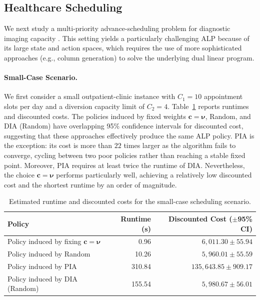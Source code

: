 \documentclass[sglanonrev]{informs4}
\providecommand{\bc}{\boldsymbol{c}}
\def\edits#1{{\color{black}#1}}
\begin{document}
\subsection{Healthcare Scheduling}
\label{sec:scheduling}
\edits{We next study a multi-priority advance-scheduling problem for diagnostic imaging capacity \citep{patrick2008dynamic}. This setting yields a particularly challenging \ac{ALP} because of its large state and action spaces, which requires the use of more sophisticated approaches (e.g., column generation) to solve the underlying dual linear program.}

\smallskip 
\paragraph{Small-Case Scenario.} We first consider a small outpatient-clinic instance with $C_1 = 10$ appointment slots per day and a diversion capacity limit of $C_2 = 4$. Table~\ref{tab:scheduling_small} reports runtimes and discounted costs. The policies induced by fixed weights $\bc=\boldsymbol{\nu}$, Random, and \ac{DIA} (Random) have overlapping 95\% confidence intervals for discounted cost, suggesting that these approaches effectively produce the same \ac{ALP} policy. \ac{PIA} is the exception: its cost is more than $22$ times larger as the algorithm fails to converge, cycling between two poor policies rather than reaching a stable fixed point. Moreover, \ac{PIA} requires at least twice the runtime of \ac{DIA}. Nevertheless, the choice $\bc=\boldsymbol{\nu}$ performs particularly well, achieving a relatively low discounted cost and the shortest runtime by an order of magnitude.


\begin{table}[ht]
\centering
\footnotesize
\begin{tabular}{lrr}
  \toprule
  \textbf{Policy} &\textbf{ Runtime (s)} & \textbf{Discounted Cost ($\pm$95\% \ac{CI})} \\
  \midrule
  Policy induced by fixing $\bc=\boldsymbol{\nu}$   & 0.96 & $6,011.30 \pm 55.94$ \\
  Policy induced by Random   & 10.26 & $5,960.01 \pm 55.59$ \\
  Policy induced by \ac{PIA}            & 310.84 & $135,643.85 \pm 909.17$ \\
  Policy induced by \ac{DIA} (Random)  & 155.54 & $5,980.67 \pm 56.01$ \\
  \bottomrule
\end{tabular}
\caption{Estimated runtime and discounted costs for the small-case scheduling scenario.}
\label{tab:scheduling_small}
\end{table}
\end{document}

